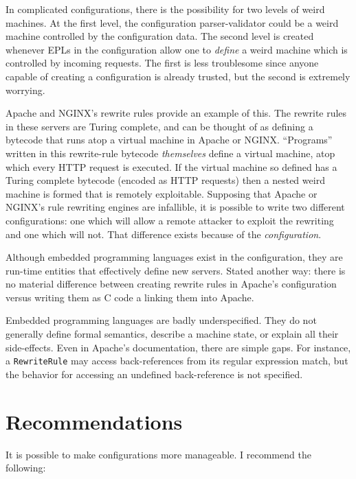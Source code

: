 \documentclass[letterpaper,twocolumn,10pt]{article}
\begin{document}
In complicated configurations, there is the possibility for two levels of weird machines. At the first level, the configuration parser-validator could be a weird machine controlled by the configuration data. The second level is created whenever EPLs in the configuration allow one to \emph{define} a weird machine which is controlled by incoming requests. The first is less troublesome since anyone capable of creating a configuration is already trusted, but the second is extremely worrying.

Apache and NGINX's rewrite rules provide an example of this. The rewrite rules in these servers are Turing complete, and can be thought of as defining a bytecode that runs atop a virtual machine in Apache or NGINX. ``Programs'' written in this rewrite-rule bytecode \emph{themselves} define a virtual machine, atop which every HTTP request is executed. If the virtual machine so defined has a Turing complete bytecode (encoded as HTTP requests) then a nested weird machine is formed that is remotely exploitable. Supposing that Apache or NGINX's rule rewriting engines are infallible, it is possible to write two different configurations: one which will allow a remote attacker to exploit the rewriting and one which will not. That difference exists because of the \emph{configuration}.

Although embedded programming languages exist in the configuration, they are run-time entities that effectively define new servers. Stated another way: there is no material difference between creating rewrite rules in Apache's configuration versus writing them as C code a linking them into Apache.

Embedded programming languages are badly underspecified. They do not generally define formal semantics, describe a machine state, or explain all their side-effects. Even in Apache's documentation, there are simple gaps. For instance, a \texttt{RewriteRule} may access back-references from its regular expression match, but the behavior for accessing an undefined back-reference is not specified.


\section{Recommendations}
It is possible to make configurations more manageable. I recommend the following:
\end{document}

